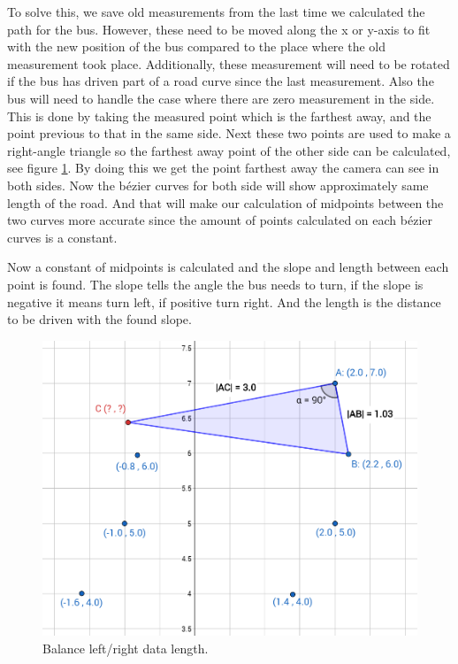 To solve this, we save old measurements from the last time we calculated the path for the bus. However, these need to be moved along the x or y-axis to fit with the new position of the bus compared to the place where the old measurement took place. Additionally, these measurement will need to be rotated if the bus has driven part of a road curve since the last measurement. Also the bus will need to handle the case where there are zero measurement in the side. This is done by taking the measured point which is the farthest away, and the point previous to that in the same side. Next these two points are used to make a right-angle triangle so the farthest away point of the other side can be calculated, see figure \ref{fig:findK}. By doing this we get the point farthest away the camera can see in both sides. Now the bézier curves for both side will show approximately same length of the road. And that will make our calculation of midpoints between the two curves more accurate since the amount of points calculated on each bézier curves is a constant.

Now a constant of midpoints is calculated and the slope and length between each point is found. The slope tells the angle the bus needs to turn, if the slope is negative it means turn left, if positive turn right. And the length is the distance to be driven with the found slope. 


\begin{figure}[ht]
    \includegraphics[width=\textwidth]{Images/Design/findK.PNG}
    \caption{Balance left/right data length.}
    \label{fig:findK}
\end{figure}





